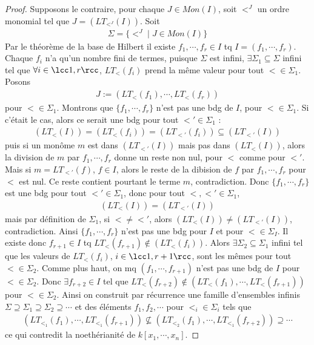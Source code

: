         \begin{proof}
            Supposons le contraire, pour chaque $J \in Mon(I)$, soit $<^J$ un ordre monomial tel que $J = (LT_{<^J}(I))$. Soit
            \begin{align*}
                \Sigma = \{<^J \mid J \in Mon(I)\}
            \end{align*}
            Par le théorème de la base de Hilbert  il existe $f_1, \cdots, f_r \in I$ tq $I = (f_1, \cdots, f_r)$. Chaque $f_i$ n'a qu'un nombre fini de termes, puisque $\Sigma$ est infini, $\exists \Sigma_1 \subseteq \Sigma$ infini tel que $\forall i \in \lcc 1,r \rcc$, $LT_<(f_i)$ prend la même valeur pour tout $< \in \Sigma_1$. Posons
            \begin{align*}
                J := (LT_<(f_1), \cdots, LT_<(f_r))
            \end{align*}
            pour $< \in \Sigma_1$. Montrons que $\{f_1, \cdots, f_r\}$ n'est pas une bdg de $I$, pour $< \in \Sigma_1$. Si c'était le cas, alors ce serait une bdg pour tout $<' \in \Sigma_1$ : 
            \begin{align*}
                (LT_<(I)) = (LT_<(f_i)) = (LT_{<'}(f_i)) \subseteq (LT_{<'}(I))
            \end{align*}
            puis si un monôme $m$ est dans $(LT_{<'}(I))$ mais pas dans $(LT_<(I))$, alors la division de $m$ par $f_1, \cdots, f_r$ donne un reste non nul, pour $<$ comme pour $<'$. Mais si $m = LT_{<'}(f)$, $f \in I$, alors le reste de la dibision de $f$ par $f_1, \cdots, f_r$ pour $<$ est nul. Ce reste contient pourtant le terme $m$, contradiction. Donc $\{f_1, \cdots, f_r\}$ est une bdg pour tout $<' \in \Sigma_1$, donc pour tout $<, <' \in \Sigma_1$, 
            \begin{align*}
                (LT_<(I)) = (LT_{<'}(I))
            \end{align*}
            mais par définition de $\Sigma_1$, si $< \neq <'$, alors $(LT_<(I)) \neq (LT_{<'}(I))$, contradiction. Ainsi $\{f_1, \cdots, f_r\}$ n'est pas une bdg pour $I$ et pour $< \in \Sigma_I$. Il existe donc $f_{r+1} \in I$ tq $LT_<(f_{r+1}) \notin (LT_<(f_i))$. Alors $\exists \Sigma_2 \subseteq \Sigma_1$ infini tel que les valeurs de $LT_<(f_i)$, $i \in \lcc 1,r+1 \rcc$, sont les mêmes pour tout $< \in \Sigma_2$. Comme plus haut, on mq $(f_1, \cdots, f_{r+1})$ n'est pas une bdg de $I$ pour $< \in \Sigma_2$. Donc $\exists f_{r+2} \in I$ tel que $LT_<(f_{r+2}) \notin (LT_<(f_1), \cdots, LT_<(f_{r+1}))$ pour $< \in \Sigma_2$. Ainsi on construit par récurrence une famille d'ensembles infinis $\Sigma \supseteq \Sigma_1 \supseteq \Sigma_2 \supseteq \cdots$ et des éléments $f_1, f_2, \cdots$ pour $<_i \in \Sigma_i$ tels que 
            \begin{align*}
                (LT_{<_1}(f_1), \cdots, LT_{<_1}(f_{r+1})) \nsubseteq (LT_{<_2}(f_1), \cdots, LT_{<_1}(f_{r+2})) \supseteq \cdots 
            \end{align*}
            ce qui contredit la noethérianité de $k[x_1, \cdots, x_n]$.
        \end{proof}

